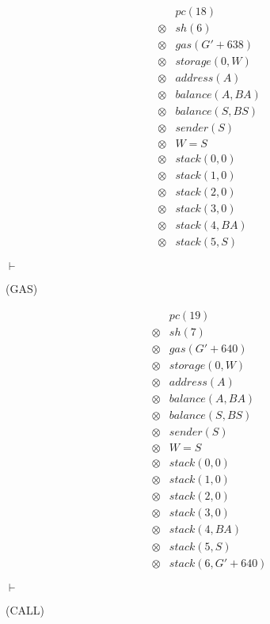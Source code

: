 \[
  \begin{array}{rcl}
    &&pc(18)\\
    &\otimes& sh(6)\\
    &\otimes& gas(G' + 638)\\
    &\otimes& storage(0, W)\\
    &\otimes& address(A)\\
    &\otimes& balance(A, BA)\\
    &\otimes& balance(S, BS)\\
    &\otimes& sender(S)\\
    &\otimes& W = S\\
    &\otimes& stack(0, 0)\\
    &\otimes& stack(1, 0)\\
    &\otimes& stack(2, 0)\\
    &\otimes& stack(3, 0)\\
    &\otimes& stack(4, BA)\\
    &\otimes& stack(5, S)
  \end{array}
\]

$\vdash$ \begin{flushright}(GAS)\end{flushright}

\[
  \begin{array}{rcl}
    &&pc(19)\\
    &\otimes& sh(7)\\
    &\otimes& gas(G' + 640)\\
    &\otimes& storage(0, W)\\
    &\otimes& address(A)\\
    &\otimes& balance(A, BA)\\
    &\otimes& balance(S, BS)\\
    &\otimes& sender(S)\\
    &\otimes& W = S\\
    &\otimes& stack(0, 0)\\
    &\otimes& stack(1, 0)\\
    &\otimes& stack(2, 0)\\
    &\otimes& stack(3, 0)\\
    &\otimes& stack(4, BA)\\
    &\otimes& stack(5, S)\\
    &\otimes& stack(6, G' + 640)
  \end{array}
\]

$\vdash$ \begin{flushright}(CALL)\end{flushright}

